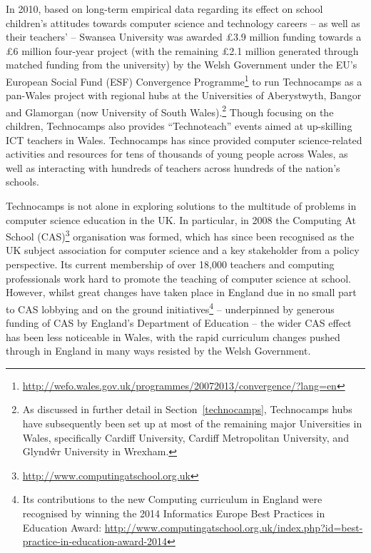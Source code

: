 In 2010, based on long-term empirical data regarding its effect on
school children's attitudes towards computer science and technology
careers -- as well as their teachers' -- Swansea University was
awarded \pounds 3.9 million funding towards a \pounds 6 million
four-year project (with the remaining \pounds 2.1 million generated
through matched funding from the university) by the Welsh Government
under the EU's European Social Fund (ESF) Convergence
Programme\footnote{\url{http://wefo.wales.gov.uk/programmes/20072013/convergence/?lang=en}}
to run Technocamps as a pan-Wales project with regional hubs at the
Universities of Aberystwyth, Bangor and Glamorgan (now University of
South Wales).\footnote{As discussed in further detail in
Section~\ref{technocamps}, Technocamps hubs have subsequently been set
up at most of the remaining major Universities in Wales, specifically
Cardiff University, Cardiff Metropolitan University, and Glynd\^wr
University in Wrexham.}  Though focusing on the children, Technocamps
also provides ``Technoteach'' events aimed at up-skilling ICT teachers
in Wales.  Technocamps has since provided computer science-related
activities and resources for tens of thousands of young people across
Wales, as well as interacting with hundreds of teachers across
hundreds of the nation's schools.

Technocamps is not alone in exploring solutions to the multitude of
problems in computer science education in the UK.  In particular, in
2008 the Computing At School
(CAS)\footnote{\url{http://www.computingatschool.org.uk}} organisation
was formed, which has since been recognised as the UK subject
association for computer science and a key stakeholder from a policy
perspective. Its current membership of over 18,000 teachers and
computing professionals work hard to promote the teaching of computer
science at school. However, whilst great changes have taken place in
England due in no small part to CAS lobbying and on the ground
initiatives\footnote{Its contributions to the new Computing curriculum
in England were recognised by winning the 2014 Informatics Europe Best
Practices in Education Award:
\url{http://www.computingatschool.org.uk/index.php?id=best-practice-in-education-award-2014}}
-- underpinned by generous funding of CAS by England's Department of
Education -- the wider CAS effect has been less noticeable in Wales,
with the rapid curriculum changes pushed through in England in many
ways resisted by the Welsh Government.

